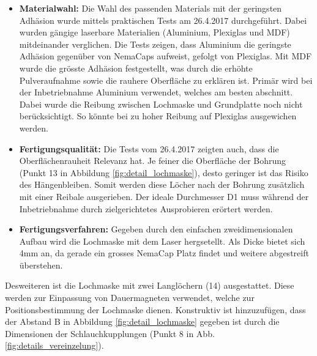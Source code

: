 \begin{itemize}
	\item \textbf{Materialwahl:} Die Wahl des passenden Materials mit der geringsten Adhäsion wurde mittels praktischen Tests am 26.4.2017 durchgeführt. Dabei wurden gängige laserbare Materialien (Aluminium, Plexiglas und MDF) mitdeinander verglichen. Die Tests zeigen, dass Aluminium die geringste Adhäsion gegenüber von NemaCaps aufweist, gefolgt von Plexiglas. Mit MDF wurde die grösste Adhäsion festgestellt, was durch die erhöhte Pulveraufnahme sowie die rauhere Oberfläche zu erklären ist. Primär wird bei der Inbetriebnahme Aluminium verwendet, welches am besten abschnitt. Dabei wurde die Reibung zwischen Lochmaske und Grundplatte noch nicht berücksichtigt. So könnte bei zu hoher Reibung auf Plexiglas ausgewichen werden.
	
	\item \textbf{Fertigungsqualität:} Die Tests vom 26.4.2017 zeigten auch, dass die Oberflächenrauheit Relevanz hat. Je feiner die Oberfläche der Bohrung (Punkt 13 in Abbildung \ref{fig:detail_lochmaske}), desto geringer ist das Risiko des Hängenbleiben. Somit werden diese Löcher nach der Bohrung zusätzlich mit einer Reibale ausgerieben. Der ideale Durchmesser D1 muss während der Inbetriebnahme durch zielgerichtetes Ausprobieren erörtert werden.
	
	\item \textbf{Fertigungsverfahren:} Gegeben durch den einfachen zweidimensionalen Aufbau wird die Lochmaske mit dem Laser hergsetellt. Als Dicke bietet sich 4mm an, da gerade ein grosses NemaCap Platz findet und weitere abgestreift überstehen.
\end{itemize}
Desweiteren ist die Lochmaske mit zwei Langlöchern (14) ausgestattet. Diese werden zur Einpassung von Dauermagneten verwendet, welche zur Positionsbestimmung der Lochmaske dienen. Konstruktiv ist hinzuzufügen, dass der Abstand B in Abbildung \ref{fig:detail_lochmaske} gegeben ist durch die Dimensionen der Schlauchkupplungen (Punkt 8 in Abb. \ref{fig:details_vereinzelung}).
